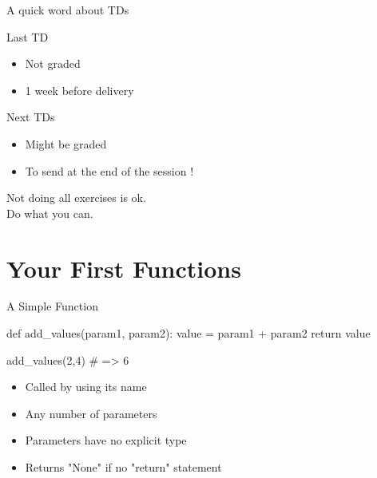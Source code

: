 \documentclass[serif, aspectratio=169]{beamer}
\begin{document}
\begin{frame}{A quick word about TDs}
    \begin{block}{Last TD}
        \begin{itemize}
            \item Not graded
            \item 1 week before delivery
        \end{itemize}
    \end{block}
    \begin{block}{Next TDs}
        \begin{itemize}
            \item Might be graded
            \item To send at the end of the session !
        \end{itemize}
    \end{block}
    \vspace{15pt}
    \begin{center}
        \Large
        Not doing all exercises is ok. \\ Do what you can.
    \end{center}
\end{frame}

\section{Your First Functions}

\begin{frame}[fragile]{A Simple Function}
    \begin{pythoncode}
    def add_values(param1, param2):
        value = param1 + param2
        return value

    add_values(2,4) # => 6
    \end{pythoncode}
    \begin{block}{}
        \begin{itemize}
            \item Called by using its name
            \item Any number of parameters
            \item Parameters have no explicit type
            \item Returns "None" if no "return" statement
        \end{itemize}
    \end{block}
\end{frame}
\end{document}
